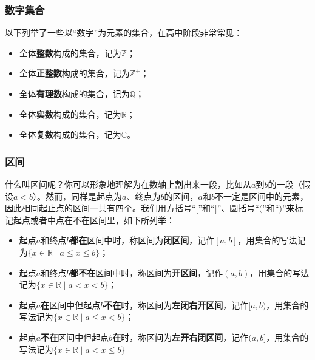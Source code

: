 \subsubsection{数字集合}


以下列举了一些以“数字”为元素的集合，在高中阶段非常常见：

\begin{itemize}
\item 全体\textbf{整数}构成的集合，记为$\mathbb{Z}$；
\item 全体\textbf{正整数}构成的集合，记为$\mathbb{Z}^+$；
\item 全体\textbf{有理数}构成的集合，记为$\mathbb{Q}$；
\item 全体\textbf{实数}构成的集合，记为$\mathbb{R}$；
\item 全体\textbf{复数}构成的集合，记为$\mathbb{C}$。
\end{itemize}










\subsubsection{区间}

什么叫区间呢？你可以形象地理解为在数轴上割出来一段，比如从$a$到$b$的一段（假设$a<b$）。然而，同样是起点为$a$、终点为$b$的区间，$a$和$b$不一定是区间中的元素，因此相同起止点的区间一共有四个。我们用方括号“$[$”和“$]$”、圆括号“$($”和“$)$”来标记起点或者中点在不在区间里，如下所列举：
\begin{itemize}
\item 起点$a$和终点$b$\textbf{都在}区间中时，称区间为\textbf{闭区间}，记作$[a,b]$，用集合的写法记为$\{x\in\mathbb{R}\mid a\leq x\leq b\}$；
\item 起点$a$和终点$b$\textbf{都不在}区间中时，称区间为\textbf{开区间}，记作$(a,b)$，用集合的写法记为$\{x\in\mathbb{R}\mid a< x<b\}$；
\item 起点$a$\textbf{在}区间中但起点$b$\textbf{不在}时，称区间为\textbf{左闭右开区间}，记作$[a,b)$，用集合的写法记为$\{x\in\mathbb{R}\mid a\leq x< b\}$；
\item 起点$a$\textbf{不在}区间中但起点$b$\textbf{在}时，称区间为\textbf{左开右闭区间}，记作$(a,b]$，用集合的写法记为$\{x\in\mathbb{R}\mid a< x\leq b\}$
\end{itemize}





